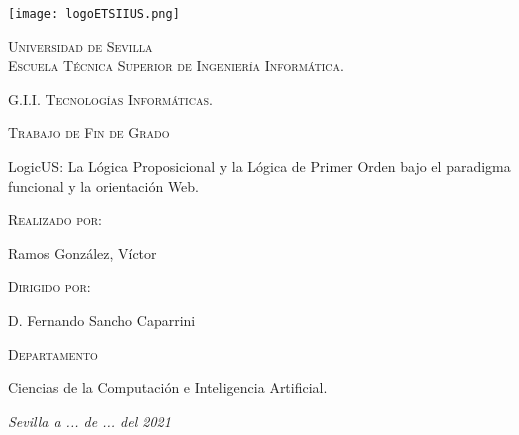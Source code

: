 

\blankpage

\begin{titlepage}
\begin{center}
\texttt{[image: logoETSIIUS.png]}

\vspace{1cm}

{\large \textsc{Universidad de Sevilla \\ Escuela Técnica Superior de Ingeniería Informática.}}

\vspace{0.5cm}

{\large \textsc{G.I.I. Tecnologías Informáticas.}}

\vspace{1cm}

{\Large \textsc{Trabajo de Fin de Grado}}

\vspace{1cm}


{\LARGE LogicUS: La Lógica Proposicional y la Lógica de Primer Orden bajo el paradigma funcional y la orientación Web.}

\vspace{1cm}

{\large \textsc{Realizado por:}}

{\large Ramos González, Víctor}

\vspace{1cm}

{\large \textsc{Dirigido por:}}

{\large D. Fernando Sancho Caparrini}

\vspace{1cm}

{\large \textsc{Departamento}}

{\large Ciencias de la Computación e Inteligencia Artificial.}
\end{center}

\vspace{1cm}
\begin{flushright}
\textit{Sevilla a ... de ... del 2021 \quad}
\end{flushright}
\end{titlepage}
